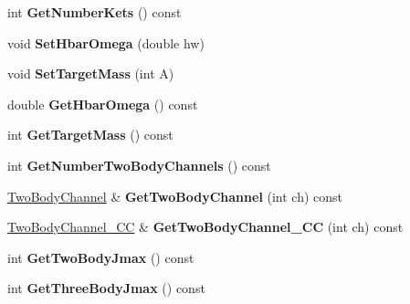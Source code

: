\begin{DoxyCompactItemize}
\item 
\hypertarget{classModelSpace_a2a46d43beb6d4e2de8c978ff921f4047}{int {\bfseries Get\-Number\-Kets} () const }\label{classModelSpace_a2a46d43beb6d4e2de8c978ff921f4047}

\item 
\hypertarget{classModelSpace_abc4f6a563b71977d1e0a99eb5367a2d7}{void {\bfseries Set\-Hbar\-Omega} (double hw)}\label{classModelSpace_abc4f6a563b71977d1e0a99eb5367a2d7}

\item 
\hypertarget{classModelSpace_ab29013a1b7b4b8b26d5905f97c135931}{void {\bfseries Set\-Target\-Mass} (int A)}\label{classModelSpace_ab29013a1b7b4b8b26d5905f97c135931}

\item 
\hypertarget{classModelSpace_a4cf15b20d8262cdab4ab1cadd412de7f}{double {\bfseries Get\-Hbar\-Omega} () const }\label{classModelSpace_a4cf15b20d8262cdab4ab1cadd412de7f}

\item 
\hypertarget{classModelSpace_a2f6a8428767c064a63796d4fc010e41e}{int {\bfseries Get\-Target\-Mass} () const }\label{classModelSpace_a2f6a8428767c064a63796d4fc010e41e}

\item 
\hypertarget{classModelSpace_a7c0b9152d68e069f9774078bd2a429b7}{int {\bfseries Get\-Number\-Two\-Body\-Channels} () const }\label{classModelSpace_a7c0b9152d68e069f9774078bd2a429b7}

\item 
\hypertarget{classModelSpace_ab2c315fd347fe93dd63246dea3d02f35}{\hyperlink{classTwoBodyChannel}{Two\-Body\-Channel} \& {\bfseries Get\-Two\-Body\-Channel} (int ch) const }\label{classModelSpace_ab2c315fd347fe93dd63246dea3d02f35}

\item 
\hypertarget{classModelSpace_a6709279838180ef0a6745320c9ad6926}{\hyperlink{classTwoBodyChannel__CC}{Two\-Body\-Channel\-\_\-\-C\-C} \& {\bfseries Get\-Two\-Body\-Channel\-\_\-\-C\-C} (int ch) const }\label{classModelSpace_a6709279838180ef0a6745320c9ad6926}

\item 
\hypertarget{classModelSpace_a3cbf323130388fae05fed1b59c5bac90}{int {\bfseries Get\-Two\-Body\-Jmax} () const }\label{classModelSpace_a3cbf323130388fae05fed1b59c5bac90}

\item 
\hypertarget{classModelSpace_a23ec9e8797755abfc0986b2e2c73a056}{int {\bfseries Get\-Three\-Body\-Jmax} () const }\label{classModelSpace_a23ec9e8797755abfc0986b2e2c73a056}


\end{DoxyCompactItemize}
